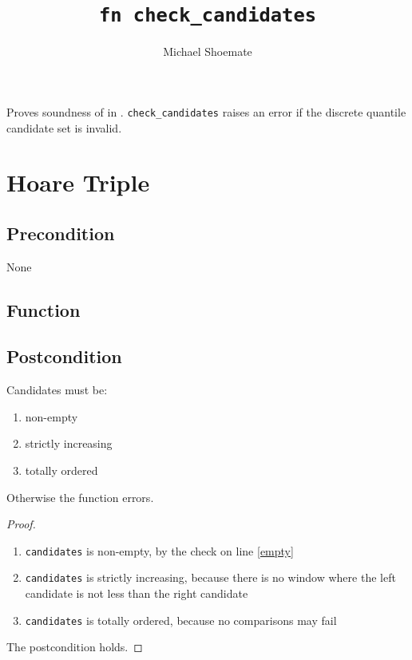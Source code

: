 \documentclass{article}
\title{\texttt{fn check\_candidates}}
\author{Michael Shoemate}
\begin{document}
\maketitle  


\contrib

Proves soundness of  
in .
\texttt{check\_candidates} raises an error if the discrete quantile candidate set is invalid.

\section{Hoare Triple}
\subsection*{Precondition}
None

\subsection*{Function}
\label{sec:python-pseudocode}


\subsection*{Postcondition}

\begin{theorem}
    Candidates must be:
    \begin{enumerate}
        \item non-empty
        \item strictly increasing
        \item totally ordered
    \end{enumerate}

    Otherwise the function errors.
\end{theorem}

\begin{proof}
    \begin{enumerate}
        \item \texttt{candidates} is non-empty, by the check on line \ref{empty}
        \item \texttt{candidates} is strictly increasing, 
            because there is no window where the left candidate is not less than the right candidate
        \item \texttt{candidates} is totally ordered, 
            because no comparisons may fail
    \end{enumerate}
    The postcondition holds.
\end{proof}
\end{document}
